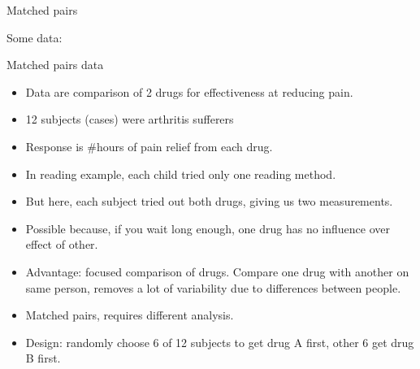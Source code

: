 \documentclass[
  ignorenonframetext,
]{beamer}
\providecommand{\tightlist}{%
  \setlength{\itemsep}{0pt}\setlength{\parskip}{0pt}}
\begin{document}
\begin{frame}{Matched pairs}
\protect\hypertarget{matched-pairs}{}

Some data:


\end{frame}

\begin{frame}{Matched pairs data}
\protect\hypertarget{matched-pairs-data}{}

\begin{itemize}
\tightlist
\item
  Data are comparison of 2 drugs for effectiveness at reducing pain.
\item
  12 subjects (cases) were arthritis sufferers
\item
  Response is \#hours of pain relief from each drug.
\item
  In reading example, each child tried only one reading method.
\item
  But here, each subject tried out both drugs, giving us two
  measurements.
\item
  Possible because, if you wait long enough, one drug has no influence
  over effect of other.
\item
  Advantage: focused comparison of drugs. Compare one drug with another
  on same person, removes a lot of variability due to differences
  between people.
\item
  Matched pairs, requires different analysis.
\item
  Design: randomly choose 6 of 12 subjects to get drug A first, other 6
  get drug B first.
\end{itemize}

\end{frame}
\end{document}
